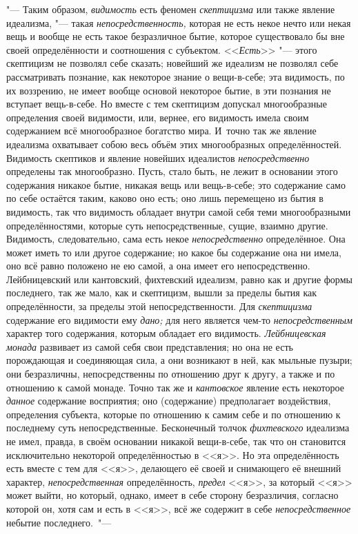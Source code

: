 "--- Таким образом, {\em видимость} есть феномен
{\em скептицизма} или также явление идеализма, "--- такая
{\em непосредственность,} которая не есть некое нечто
или некая вещь и вообще не есть такое безразличное бытие, которое
существовало бы вне своей определённости и соотношения с субъектом.
<<{\em Есть}>> "--- этого скептицизм не позволял себе
сказать; новейший же идеализм не позволял себе рассматривать познание, как
некоторое знание о вещи-в-себе; эта видимость, по их воззрению, не имеет
вообще основой некоторое бытие, в эти познания не вступает вещь-в-себе. Но
вместе с тем скептицизм допускал многообразные определения своей видимости,
или, вернее, его видимость имела своим содержанием всё многообразное
богатство мира. И~точно так же явление идеализма охватывает собою весь
объём этих многообразных определённостей. Видимость скептиков и явление
новейших идеалистов {\em непосредственно} определены
так многообразно. Пусть, стало быть, не лежит в основании этого содержания
никакое бытие, никакая вещь или вещь-в-себе; это содержание само по себе
остаётся таким, каково оно есть; оно лишь перемещено из бытия в видимость,
так что видимость обладает внутри самой себя теми многообразными
определённостями, которые суть непосредственные, сущие, взаимно другие.
Видимость, следовательно, сама есть некое
{\em непосредственно} определённое. Она может иметь то
или другое содержание; но какое бы содержание она ни имела, оно всё равно
положено не ею самой, а она имеет его непосредственно. Лейбницевский или
кантовский, фихтевский идеализм, равно как и другие формы последнего, так
же мало, как и скептицизм, вышли за пределы бытия как определённости, за
пределы этой непосредственности. Для {\em скептицизма}
содержание его видимости ему {\em дано;} для него
является чем-то {\em непосредственным} характер того
содержания, которым обладает его видимость.
{\em Лейбницевская монада} развивает из самой себя свои
представления; но она не есть порождающая и соединяющая сила, а они
возникают в ней, как мыльные пузыри; они безразличны, непосредственны по
отношению друг к другу, а также и по отношению к самой монаде. Точно так же
и {\em кантовское} явление есть некоторое
{\em данное} содержание восприятия; оно (содержание)
предполагает воздействия, определения субъекта, которые по отношению к
самим себе и по отношению к последнему суть непосредственные. Бесконечный
толчок
{\em фихтевского} идеализма не имел, правда, в своём
основании никакой вещи-в-себе, так что он становится исключительно
некоторой определённостью в <<я>>. Но эта определённость есть вместе с тем
для <<я>>, делающего её своей и снимающего её внешний характер,
{\em непосредственная} определённость,
{\em предел} <<я>>, за который <<я>> может выйти, но
который, однако, имеет в себе сторону безразличия, согласно которой он,
хотя сам и есть в <<я>>, всё же содержит в себе
{\em непосредственное} небытие последнего.~"---

